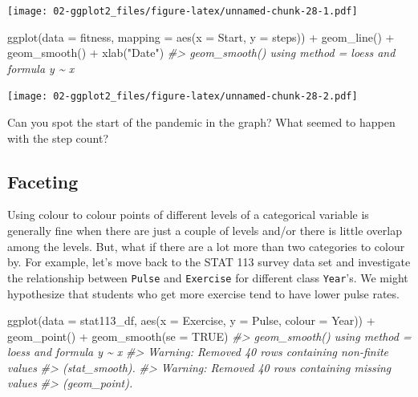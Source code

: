 \documentclass[
]{book}
\newenvironment{Shaded}{\begin{snugshade}}{\end{snugshade}}
\newcommand{\AttributeTok}[1]{\textcolor[rgb]{0.77,0.63,0.00}{#1}}
\newcommand{\CommentTok}[1]{\textcolor[rgb]{0.56,0.35,0.01}{\textit{#1}}}
\newcommand{\ConstantTok}[1]{\textcolor[rgb]{0.00,0.00,0.00}{#1}}
\newcommand{\FunctionTok}[1]{\textcolor[rgb]{0.00,0.00,0.00}{#1}}
\newcommand{\NormalTok}[1]{#1}
\newcommand{\SpecialCharTok}[1]{\textcolor[rgb]{0.00,0.00,0.00}{#1}}
\newcommand{\StringTok}[1]{\textcolor[rgb]{0.31,0.60,0.02}{#1}}
\begin{document}
\texttt{[image: 02-ggplot2\_files/figure-latex/unnamed-chunk-28-1.pdf]}

\begin{Shaded}
\begin{Highlighting}[]
\FunctionTok{ggplot}\NormalTok{(}\AttributeTok{data =}\NormalTok{ fitness, }\AttributeTok{mapping =} \FunctionTok{aes}\NormalTok{(}\AttributeTok{x =}\NormalTok{ Start, }\AttributeTok{y =}\NormalTok{ steps)) }\SpecialCharTok{+}
  \FunctionTok{geom\_line}\NormalTok{() }\SpecialCharTok{+} \FunctionTok{geom\_smooth}\NormalTok{() }\SpecialCharTok{+} \FunctionTok{xlab}\NormalTok{(}\StringTok{"Date"}\NormalTok{)}
\CommentTok{\#\textgreater{} \textasciigrave{}geom\_smooth()\textasciigrave{} using method = \textquotesingle{}loess\textquotesingle{} and formula \textquotesingle{}y \textasciitilde{} x\textquotesingle{}}
\end{Highlighting}
\end{Shaded}

\texttt{[image: 02-ggplot2\_files/figure-latex/unnamed-chunk-28-2.pdf]}

Can you spot the start of the pandemic in the graph? What seemed to happen with the step count?

\hypertarget{faceting}{%
\subsection{Faceting}\label{faceting}}

Using colour to colour points of different levels of a categorical variable is generally fine when there are just a couple of levels and/or there is little overlap among the levels. But, what if there are a lot more than two categories to colour by. For example, let's move back to the STAT 113 survey data set and investigate the relationship between \texttt{Pulse} and \texttt{Exercise} for different class \texttt{Year}'s. We might hypothesize that students who get more exercise tend to have lower pulse rates.

\begin{Shaded}
\begin{Highlighting}[]
\FunctionTok{ggplot}\NormalTok{(}\AttributeTok{data =}\NormalTok{ stat113\_df, }\FunctionTok{aes}\NormalTok{(}\AttributeTok{x =}\NormalTok{ Exercise, }\AttributeTok{y =}\NormalTok{ Pulse,}
                           \AttributeTok{colour =}\NormalTok{ Year)) }\SpecialCharTok{+}
  \FunctionTok{geom\_point}\NormalTok{() }\SpecialCharTok{+}
  \FunctionTok{geom\_smooth}\NormalTok{(}\AttributeTok{se =} \ConstantTok{TRUE}\NormalTok{)}
\CommentTok{\#\textgreater{} \textasciigrave{}geom\_smooth()\textasciigrave{} using method = \textquotesingle{}loess\textquotesingle{} and formula \textquotesingle{}y \textasciitilde{} x\textquotesingle{}}
\CommentTok{\#\textgreater{} Warning: Removed 40 rows containing non{-}finite values}
\CommentTok{\#\textgreater{} (stat\_smooth).}
\CommentTok{\#\textgreater{} Warning: Removed 40 rows containing missing values}
\CommentTok{\#\textgreater{} (geom\_point).}
\end{Highlighting}
\end{Shaded}
\end{document}
